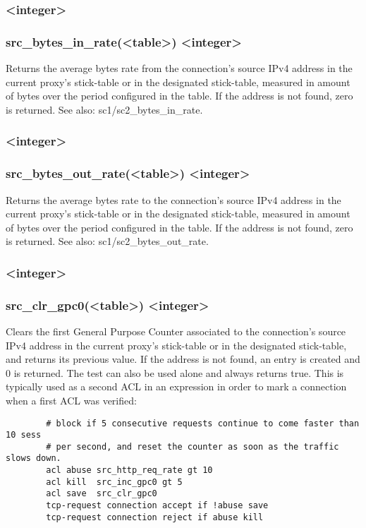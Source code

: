 \subsubsection[src\_bytes\_in\_rate]{ <integer>}
\subsubsection*{src\_bytes\_in\_rate(<table>) <integer>}
  Returns the average bytes rate from the connection's source IPv4 address in
  the current proxy's stick-table or in the designated stick-table, measured in
  amount of bytes over the period configured in the table. If the address is
  not found, zero is returned. See also: sc1/sc2\_bytes\_in\_rate.

\subsubsection[src\_bytes\_out\_rate]{ <integer>}
\subsubsection*{src\_bytes\_out\_rate(<table>) <integer>}
  Returns the average bytes rate to the connection's source IPv4 address in the
  current proxy's stick-table or in the designated stick-table, measured in
  amount of bytes over the period configured in the table. If the address is
  not found, zero is returned. See also: sc1/sc2\_bytes\_out\_rate.

\subsubsection[src\_clr\_gpc0]{ <integer>}
\subsubsection*{src\_clr\_gpc0(<table>) <integer>}
  Clears the first General Purpose Counter associated to the connection's
  source IPv4 address in the current proxy's stick-table or in the designated
  stick-table, and returns its previous value. If the address is not found, an
  entry is created and 0 is returned. The test can also be used alone and
  always returns true. This is typically used as a second ACL in an expression
  in order to mark a connection when a first ACL was verified:

\begin{verbatim}
        # block if 5 consecutive requests continue to come faster than 10 sess
        # per second, and reset the counter as soon as the traffic slows down.
        acl abuse src_http_req_rate gt 10
        acl kill  src_inc_gpc0 gt 5
        acl save  src_clr_gpc0
        tcp-request connection accept if !abuse save
        tcp-request connection reject if abuse kill
\end{verbatim}

